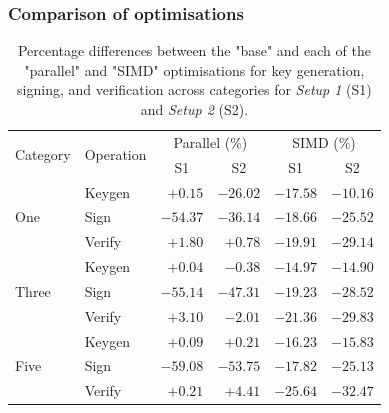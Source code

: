 \documentclass[11pt]{report}
\theoremstyle{definition}
\theoremstyle{plain}
\begin{document}
\subsubsection{Comparison of optimisations}\label{sub:comparison_optimisations}

\begin{table}[H]
  \centering
  \begin{tabular}{l|l|rr|rr}
    \hline
    \multirow{2}{*}{Category} & \multirow{2}{*}{Operation} & \multicolumn{2}{c|}{Parallel (\%)} & \multicolumn{2}{c}{SIMD (\%)}                                                   \\
                              &                            & \multicolumn{1}{c}{S1}             & \multicolumn{1}{c}{S2}        & \multicolumn{1}{c}{S1} & \multicolumn{1}{c}{S2} \\
    \hline
    \multirow{3}{*}{One}
                              & Keygen                     & $+0.15$                            & $-26.02$                      & $-17.58$               & $-10.16$               \\
                              & Sign                       & $-54.37$                           & $-36.14$                      & $-18.66$               & $-25.52$               \\
                              & Verify                     & $+1.80$                            & $+0.78$                       & $-19.91$               & $-29.14$               \\
    \hline
    \multirow{3}{*}{Three}
                              & Keygen                     & $+0.04$                            & $-0.38$                       & $-14.97$               & $-14.90$               \\
                              & Sign                       & $-55.14$                           & $-47.31$                      & $-19.23$               & $-28.52$               \\
                              & Verify                     & $+3.10$                            & $-2.01$                       & $-21.36$               & $-29.83$               \\
    \hline
    \multirow{3}{*}{Five}
                              & Keygen                     & $+0.09$                            & $+0.21$                       & $-16.23$               & $-15.83$               \\
                              & Sign                       & $-59.08$                           & $-53.75$                      & $-17.82$               & $-25.13$               \\
                              & Verify                     & $+0.21$                            & $+4.41$                       & $-25.64$               & $-32.47$               \\
    \hline
  \end{tabular}
  \caption{Percentage differences between the "base" and each of the "parallel" and "SIMD" optimisations for key generation, signing, and verification across categories for \textit{Setup 1} (S1) and \textit{Setup 2} (S2).}
  \label{tab:base_vs_parallel_simd_s1_s2}
\end{table}
\end{document}
